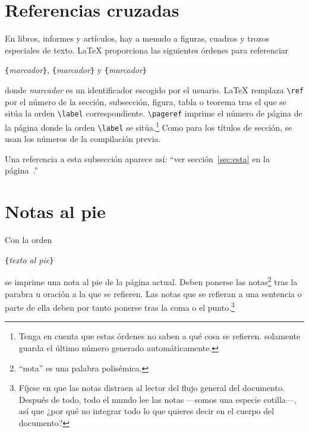\section{Referencias cruzadas}

En libros, informes y artículos, hay a menudo  a figuras, cuadros y trozos especiales de texto. \LaTeX{} proporciona las siguientes órdenes para referenciar
\begin{lscommand}
\verb|{|\emph{marcador}\verb|}|, \verb|{|\emph{marcador}\verb|}| 
y \verb|{|\emph{marcador}\verb|}|
\end{lscommand}
donde \emph{marcador} es un identificador escogido por el usuario. \LaTeX{} remplaza \verb|\ref| por el número de la sección, subsección, figura, tabla o teorema tras el que se sitúa la orden \verb|\label| correspondiente. \verb|\pageref| imprime el número de página de la página donde la orden \verb|\label| se sitúa.\footnote{Tenga en cuenta que estas órdenes no saben a qué cosa se refieren.  solamente guarda el último número generado automáticamente.}  Como para los títulos de sección, se usan los números de la compilación previa.

\begin{example}
Una referencia a esta subsección
\label{sec:esta} aparece así:
``ver sección~\ref{sec:esta} en
la página~\pageref{sec:esta}.''
\end{example}
 
\section{Notas al pie}

Con la orden
\begin{lscommand}
\verb|{|\emph{texto al pie}\verb|}|
\end{lscommand}
se imprime una nota al pie de la página actual.  Deben ponerse las notas\footnote{``nota'' es una palabra polisémica.} tras la parabra u oración a la que se refieren.  Las notas que se refieran a una sentencia o parte de ella deben por tanto ponerse tras la coma o el punto.\footnote{Fíjese en que las notas distraen al lector del flujo general del documento.  Después de todo, todo el mundo lee las notas ---somos una especie cotilla---, así que ¿por qué no integrar todo lo que quieres decir en el cuerpo del documento?\footnotemark} 

